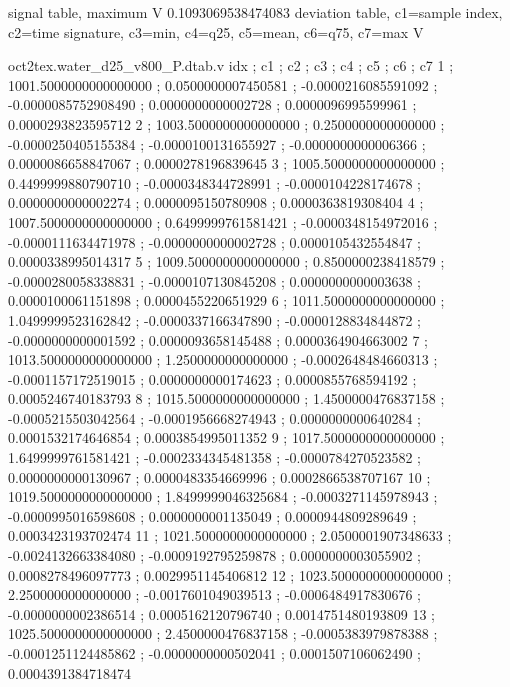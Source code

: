 \expandafter\def\csname oct2tex.water_d25_v800_P.stabmax.d\endcsname{signal table, maximum}
\expandafter\def\csname oct2tex.water_d25_v800_P.stabmax.u\endcsname{\ensuremath{\text{V}}}
\expandafter\def\csname oct2tex.water_d25_v800_P.stabmax.v\endcsname{0.1093069538474083}
\expandafter\def\csname oct2tex.water_d25_v800_P.dtab.d\endcsname{deviation table, c1=sample index, c2=time signature, c3=min, c4=q25, c5=mean, c6=q75, c7=max}
\expandafter\def\csname oct2tex.water_d25_v800_P.dtab.u\endcsname{\ensuremath{\text{V}}}
\begin{filecontents}[overwrite]{oct2tex.water_d25_v800_P.dtab.v}
idx ; c1 ; c2 ; c3 ; c4 ; c5 ; c6 ; c7
1 ; 1001.5000000000000000 ; 0.0500000007450581 ; -0.0000216085591092 ; -0.0000085752908490 ; 0.0000000000002728 ; 0.0000096995599961 ; 0.0000293823595712
2 ; 1003.5000000000000000 ; 0.2500000000000000 ; -0.0000250405155384 ; -0.0000100131655927 ; -0.0000000000006366 ; 0.0000086658847067 ; 0.0000278196839645
3 ; 1005.5000000000000000 ; 0.4499999880790710 ; -0.0000348344728991 ; -0.0000104228174678 ; 0.0000000000002274 ; 0.0000095150780908 ; 0.0000363819308404
4 ; 1007.5000000000000000 ; 0.6499999761581421 ; -0.0000348154972016 ; -0.0000111634471978 ; -0.0000000000002728 ; 0.0000105432554847 ; 0.0000338995014317
5 ; 1009.5000000000000000 ; 0.8500000238418579 ; -0.0000280058338831 ; -0.0000107130845208 ; 0.0000000000003638 ; 0.0000100061151898 ; 0.0000455220651929
6 ; 1011.5000000000000000 ; 1.0499999523162842 ; -0.0000337166347890 ; -0.0000128834844872 ; -0.0000000000001592 ; 0.0000093658145488 ; 0.0000364904663002
7 ; 1013.5000000000000000 ; 1.2500000000000000 ; -0.0002648484660313 ; -0.0001157172519015 ; 0.0000000000174623 ; 0.0000855768594192 ; 0.0005246740183793
8 ; 1015.5000000000000000 ; 1.4500000476837158 ; -0.0005215503042564 ; -0.0001956668274943 ; 0.0000000000640284 ; 0.0001532174646854 ; 0.0003854995011352
9 ; 1017.5000000000000000 ; 1.6499999761581421 ; -0.0002334345481358 ; -0.0000784270523582 ; 0.0000000000130967 ; 0.0000483354669996 ; 0.0002866538707167
10 ; 1019.5000000000000000 ; 1.8499999046325684 ; -0.0003271145978943 ; -0.0000995016598608 ; 0.0000000001135049 ; 0.0000944809289649 ; 0.0003423193702474
11 ; 1021.5000000000000000 ; 2.0500001907348633 ; -0.0024132663384080 ; -0.0009192795259878 ; 0.0000000003055902 ; 0.0008278496097773 ; 0.0029951145406812
12 ; 1023.5000000000000000 ; 2.2500000000000000 ; -0.0017601049039513 ; -0.0006484917830676 ; -0.0000000002386514 ; 0.0005162120796740 ; 0.0014751480193809
13 ; 1025.5000000000000000 ; 2.4500000476837158 ; -0.0005383979878388 ; -0.0001251124485862 ; -0.0000000000502041 ; 0.0001507106062490 ; 0.0004391384718474

\end{filecontents}

